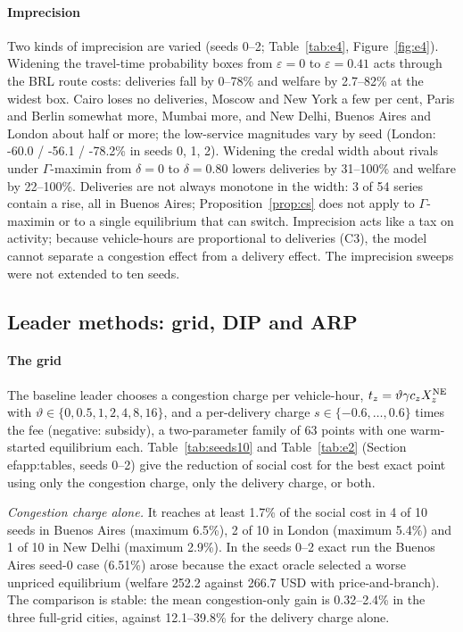 \documentclass[preprint,11pt]{elsarticle}
\theoremstyle{definition}
\theoremstyle{remark}
\begin{document}
\paragraph{Imprecision} Two kinds of imprecision are varied (seeds 0--2; Table~\ref{tab:e4}, Figure~\ref{fig:e4}). Widening the travel-time probability boxes from $\varepsilon=0$ to $\varepsilon=0.41$ acts through the BRL route costs: deliveries fall by 0--78\% and welfare by 2.7--82\% at the widest box. Cairo loses no deliveries, Moscow and New York a few per cent, Paris and Berlin somewhat more, Mumbai more, and New Delhi, Buenos Aires and London about half or more; the low-service magnitudes vary by seed (London: -60.0 / -56.1 / -78.2\% in seeds 0, 1, 2). Widening the credal width about rivals under $\Gamma$-maximin from $\delta=0$ to $\delta=0.80$ lowers deliveries by 31--100\% and welfare by 22--100\%. Deliveries are not always monotone in the width: 3 of 54 series contain a rise, all in Buenos Aires; Proposition~\ref{prop:cs} does not apply to $\Gamma$-maximin or to a single equilibrium that can switch. Imprecision acts like a tax on activity; because vehicle-hours are proportional to deliveries (C3), the model cannot separate a congestion effect from a delivery effect. The imprecision sweeps were not extended to ten seeds.

\subsection{Leader methods: grid, DIP and ARP}\label{sec:res-leader}

\paragraph{The grid} The baseline leader chooses a congestion charge per vehicle-hour, $t_z=\vartheta\gamma c_zX_z^{\rm NE}$ with $\vartheta\in\{0,0.5,1,2,4,8,16\}$, and a per-delivery charge $s\in\{-0.6,\dots,0.6\}$ times the fee (negative: subsidy), a two-parameter family of 63 points with one warm-started equilibrium each. Table~\ref{tab:seeds10} and Table~\ref{tab:e2} (Section~
ef{app:tables}, seeds 0--2) give the reduction of social cost for the best exact point using only the congestion charge, only the delivery charge, or both.

\emph{Congestion charge alone.} It reaches at least 1.7\% of the social cost in 4 of 10 seeds in Buenos Aires (maximum 6.5\%), 2 of 10 in London (maximum 5.4\%) and 1 of 10 in New Delhi (maximum 2.9\%). In the seeds 0--2 exact run the Buenos Aires seed-0 case (6.51\%) arose because the exact oracle selected a worse unpriced equilibrium (welfare 252.2 against 266.7 USD with price-and-branch). The comparison is stable: the mean congestion-only gain is 0.32--2.4\% in the three full-grid cities, against 12.1--39.8\% for the delivery charge alone.
\end{document}
